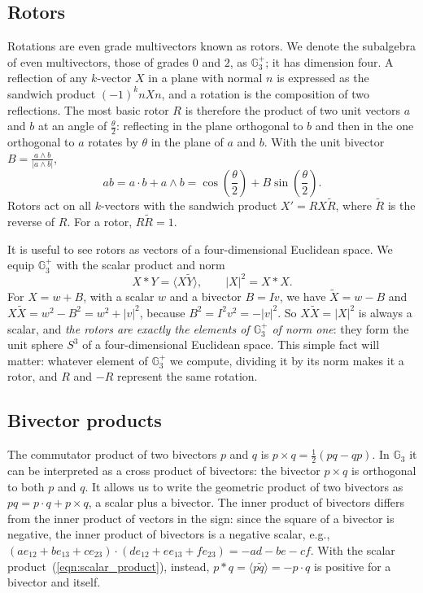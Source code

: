 \documentclass{birkjour}
\theoremstyle{definition}
\theoremstyle{remark}
\numberwithin{equation}{section}
\newcommand{\rev}[1]{\widetilde{#1}}
\newcommand{\scal}[1]{\langle #1 \rangle}
\newcommand{\Ge}{\mathbb{G}}
\begin{document}
\subsection{Rotors}

Rotations are even grade multivectors known as rotors. We denote the subalgebra of even multivectors, those of grades $0$ and $2$, as $\Ge_3^+$; it has dimension four. A reflection of any $k$-vector $X$ in a plane with normal $n$ is expressed as the sandwich product $(-1)^k n X n$, and a rotation is the composition of two reflections. The most basic rotor $R$ is therefore the product of two unit vectors $a$ and $b$ at an angle of $\frac{\theta}{2}$: reflecting in the plane orthogonal to $b$ and then in the one orthogonal to $a$ rotates by $\theta$ in the plane of $a$ and $b$. With the unit bivector $B = \frac{a \wedge b}{|a \wedge b|}$,
\begin{equation}
a b = a \cdot b + a \wedge b = \cos\left( \frac{\theta}{2} \right) + B \sin\left( \frac{\theta}{2} \right).
\end{equation}
Rotors act on all $k$-vectors with the sandwich product $X' = R X \rev{R}$, where $\rev{R}$ is the reverse of $R$. For a rotor, $R \rev{R} = 1$.

It is useful to see rotors as vectors of a four-dimensional Euclidean space. We equip $\Ge_3^+$ with the scalar product and norm
\begin{equation}
\label{eqn:scalar_product}
X * Y = \scal{X \rev{Y}}, \qquad |X|^2 = X * X.
\end{equation}
For $X = w + B$, with a scalar $w$ and a bivector $B = I v$, we have $\rev{X} = w - B$ and $X \rev{X} = w^2 - B^2 = w^2 + |v|^2$, because $B^2 = I^2 v^2 = -|v|^2$. So $X \rev{X} = |X|^2$ is always a scalar, and \emph{the rotors are exactly the elements of $\Ge_3^+$ of norm one}: they form the unit sphere $S^3$ of a four-dimensional Euclidean space. This simple fact will matter: whatever element of $\Ge_3^+$ we compute, dividing it by its norm makes it a rotor, and $R$ and $-R$ represent the same rotation.

\subsection{Bivector products}

The commutator product of two bivectors $p$ and $q$ is $p \times q = \frac{1}{2}(p q - q p)$. In $\Ge_3$ it can be interpreted as a cross product of bivectors: the bivector $p \times q$ is orthogonal to both $p$ and $q$. It allows us to write the geometric product of two bivectors as $p q = p \cdot q + p \times q$, a scalar plus a bivector. The inner product of bivectors differs from the inner product of vectors in the sign: since the square of a bivector is negative, the inner product of bivectors is a negative scalar, e.g., $(a e_{12} + b e_{13} + c e_{23}) \cdot (d e_{12} + e e_{13} + f e_{23}) = -a d - b e - c f$. With the scalar product~(\ref{eqn:scalar_product}), instead, $p * q = \scal{p \rev{q}} = -p \cdot q$ is positive for a bivector and itself.
\end{document}
